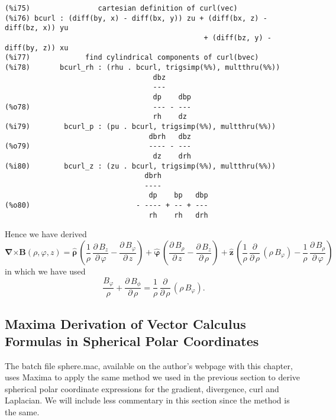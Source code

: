 \documentclass[12pt]{article}
\begin{document}
\small
\begin{verbatim}
(%i75)                cartesian definition of curl(vec)   
(%i76) bcurl : (diff(by, x) - diff(bx, y)) zu + (diff(bx, z) - diff(bz, x)) yu
                                               + (diff(bz, y) - diff(by, z)) xu
(%i77)             find cylindrical components of curl(bvec) 
(%i78)       bcurl_rh : (rhu . bcurl, trigsimp(%%), multthru(%%))
                                   dbz
                                   ---
                                   dp    dbp
(%o78)                             --- - ---
                                   rh    dz
(%i79)        bcurl_p : (pu . bcurl, trigsimp(%%), multthru(%%))
                                  dbrh   dbz
(%o79)                            ---- - ---
                                   dz    drh
(%i80)        bcurl_z : (zu . bcurl, trigsimp(%%), multthru(%%))
                                 dbrh
                                 ----
                                  dp    bp   dbp
(%o80)                         - ---- + -- + ---
                                  rh    rh   drh
\end{verbatim}
\normalsize
Hence we have derived
\begin{equation}
\boldsymbol{\nabla} \boldsymbol{\times} \mathbf{B}(\rho,\varphi,z) =
  \boldsymbol{\hat{\rho}}\, \left( \frac{1}{\rho}\, \frac{\partial \, B_{z}}{\partial \,\varphi} -
     \frac{\partial \, B_{\varphi}}{\partial \, z} \right) +
   \boldsymbol{\hat{\varphi}} \, \left( \frac{\partial \, B_{\rho}}{\partial \,z} -
       \frac{\partial \, B_{z}}{\partial \, \rho} \right)    +
   \mathbf{\hat{z}}\, \left( \frac{1}{\rho}\, \frac{\partial }{\partial \,\rho} \,(\rho \, B_{\varphi} ) -
        \frac{1}{\rho}\, \frac{\partial \, B_{\rho}}{\partial \, \varphi} \right)  
\end{equation}
in which we have used 
\begin{equation}  \label{Eq:cycurl}
\frac{B_{\varphi}}{\rho} + \frac{\partial \, B_{\phi}}{\partial \, \rho} = 
        \frac{1}{\rho}\, \frac{\partial }{\partial \,\rho} \,(\rho \, B_{\varphi} ).
\end{equation}

\subsection{Maxima Derivation of Vector Calculus Formulas in Spherical Polar Coordinates   }
The batch file sphere.mac, available on the author's webpage with this chapter, uses Maxima
  to apply the same method we used in the previous section to derive spherical polar
  coordinate expressions for the gradient, divergence, curl and Laplacian.
We will include less commentary in this section since the method is the same.
\end{document}
